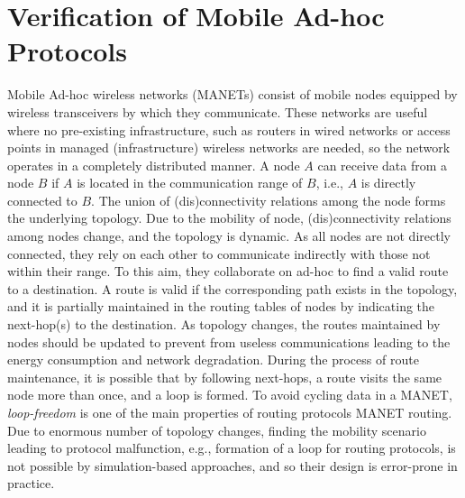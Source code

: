 \section{Verification of Mobile Ad-hoc Protocols}\label{sec::wrebeca} 
Mobile Ad-hoc wireless networks (MANETs) consist of mobile nodes equipped by wireless transceivers by which they communicate. These networks are useful where no pre-existing infrastructure, such as routers in wired networks or access points in managed (infrastructure) wireless networks are needed, so the network operates in a completely distributed manner. A node $A$ can receive data from a node $B$ if $A$ is located in the communication range of $B$, i.e., $A$ is directly connected to $B$. The union of (dis)connectivity relations among the node forms the underlying topology.  Due to the mobility of node, (dis)connectivity relations among nodes change, and the topology is dynamic. As all nodes are not directly connected, they rely on each other to communicate indirectly with those not within their range. To this aim, they collaborate on ad-hoc to find a valid route to a destination. A route is valid if the corresponding path exists in the topology, and it is partially maintained in the routing tables of nodes by indicating the next-hop(s) to the destination. As topology changes, the routes maintained by nodes should be updated to prevent from useless communications leading to the energy consumption and network degradation. During the process of route maintenance, it is possible that by following next-hops, a route visits the same node more than once, and a loop is formed. To avoid cycling data in a MANET, \emph{loop-freedom} is one of the main properties of routing protocols MANET routing. Due to enormous number of topology changes, finding the mobility scenario leading to protocol malfunction, e.g., formation of a loop for routing protocols,  %
is not possible by simulation-based approaches, and so their design is error-prone in practice.   %


